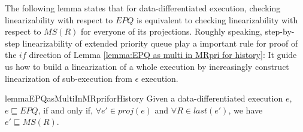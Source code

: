 The following lemma states that for data-differentiated execution, checking linearizability with respect to $\textit{EPQ}$ is equivalent to checking linearizability with respect to $\textit{MS}(R)$ for everyone of its projections. Roughly speaking, step-by-step linearizability of extended priority queue play a important rule for proof of the $\textit{if}$ direction of Lemma \ref{lemma:EPQ as multi in MRpri for history}: It guide us how to build a linearization of a whole execution by increasingly construct linearization of sub-execution from $\epsilon$ execution.

\begin{restatable}{lemma}{EPQasMultiInMRpriforHistory}
\label{lemma:EPQ as multi in MRpri for history}
Given a data-differentiated execution $e$, $e \sqsubseteq \textit{EPQ}$, if and only if, $\forall e' \in \textit{proj}(e)$ and $\forall R \in \textit{last}(e')$, we have $e' \sqsubseteq \textit{MS}(R)$.
\end{restatable}
